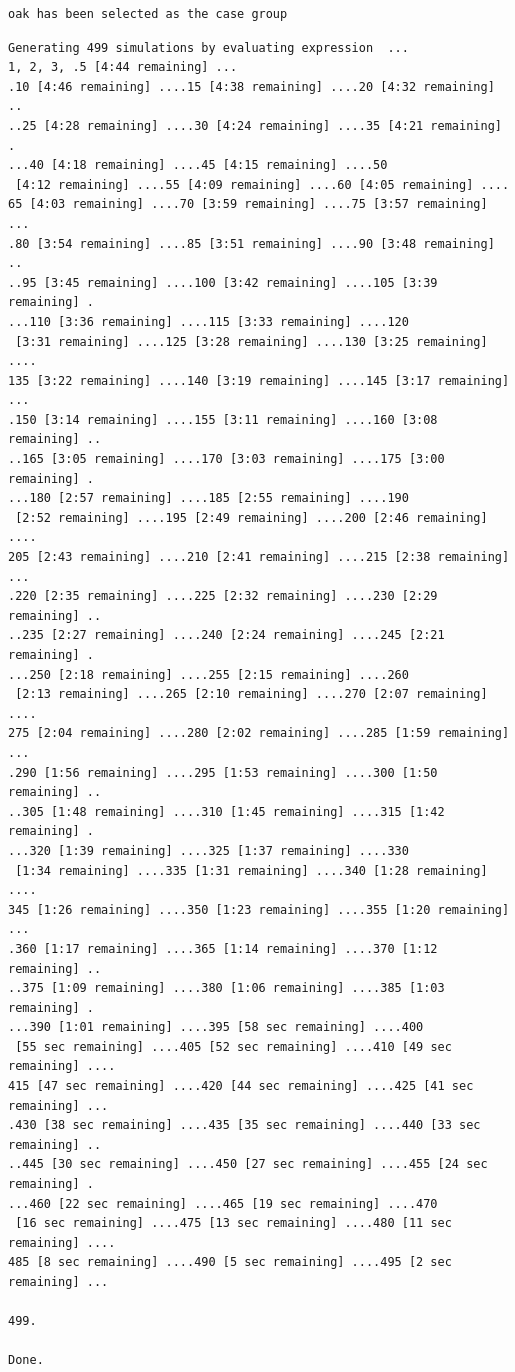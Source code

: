 \documentclass[
  letterpaper,
  DIV=11,
  numbers=noendperiod]{scrartcl}
\begin{document}
\begin{verbatim}
oak has been selected as the case group
\end{verbatim}

\begin{verbatim}
Generating 499 simulations by evaluating expression  ...
1, 2, 3, .5 [4:44 remaining] ...
.10 [4:46 remaining] ....15 [4:38 remaining] ....20 [4:32 remaining] ..
..25 [4:28 remaining] ....30 [4:24 remaining] ....35 [4:21 remaining] .
...40 [4:18 remaining] ....45 [4:15 remaining] ....50
 [4:12 remaining] ....55 [4:09 remaining] ....60 [4:05 remaining] ....
65 [4:03 remaining] ....70 [3:59 remaining] ....75 [3:57 remaining] ...
.80 [3:54 remaining] ....85 [3:51 remaining] ....90 [3:48 remaining] ..
..95 [3:45 remaining] ....100 [3:42 remaining] ....105 [3:39 remaining] .
...110 [3:36 remaining] ....115 [3:33 remaining] ....120
 [3:31 remaining] ....125 [3:28 remaining] ....130 [3:25 remaining] ....
135 [3:22 remaining] ....140 [3:19 remaining] ....145 [3:17 remaining] ...
.150 [3:14 remaining] ....155 [3:11 remaining] ....160 [3:08 remaining] ..
..165 [3:05 remaining] ....170 [3:03 remaining] ....175 [3:00 remaining] .
...180 [2:57 remaining] ....185 [2:55 remaining] ....190
 [2:52 remaining] ....195 [2:49 remaining] ....200 [2:46 remaining] ....
205 [2:43 remaining] ....210 [2:41 remaining] ....215 [2:38 remaining] ...
.220 [2:35 remaining] ....225 [2:32 remaining] ....230 [2:29 remaining] ..
..235 [2:27 remaining] ....240 [2:24 remaining] ....245 [2:21 remaining] .
...250 [2:18 remaining] ....255 [2:15 remaining] ....260
 [2:13 remaining] ....265 [2:10 remaining] ....270 [2:07 remaining] ....
275 [2:04 remaining] ....280 [2:02 remaining] ....285 [1:59 remaining] ...
.290 [1:56 remaining] ....295 [1:53 remaining] ....300 [1:50 remaining] ..
..305 [1:48 remaining] ....310 [1:45 remaining] ....315 [1:42 remaining] .
...320 [1:39 remaining] ....325 [1:37 remaining] ....330
 [1:34 remaining] ....335 [1:31 remaining] ....340 [1:28 remaining] ....
345 [1:26 remaining] ....350 [1:23 remaining] ....355 [1:20 remaining] ...
.360 [1:17 remaining] ....365 [1:14 remaining] ....370 [1:12 remaining] ..
..375 [1:09 remaining] ....380 [1:06 remaining] ....385 [1:03 remaining] .
...390 [1:01 remaining] ....395 [58 sec remaining] ....400
 [55 sec remaining] ....405 [52 sec remaining] ....410 [49 sec remaining] ....
415 [47 sec remaining] ....420 [44 sec remaining] ....425 [41 sec remaining] ...
.430 [38 sec remaining] ....435 [35 sec remaining] ....440 [33 sec remaining] ..
..445 [30 sec remaining] ....450 [27 sec remaining] ....455 [24 sec remaining] .
...460 [22 sec remaining] ....465 [19 sec remaining] ....470
 [16 sec remaining] ....475 [13 sec remaining] ....480 [11 sec remaining] ....
485 [8 sec remaining] ....490 [5 sec remaining] ....495 [2 sec remaining] ...

499.

Done.
\end{verbatim}
\end{document}
